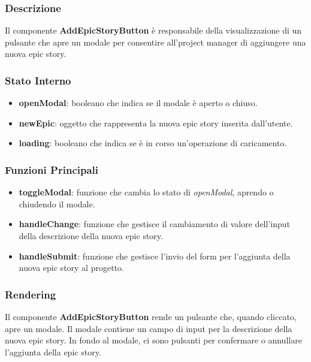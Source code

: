 \documentclass{article}
\begin{document}
\subsubsection*{Descrizione}
Il componente \textbf{AddEpicStoryButton} è responsabile della visualizzazione di un pulsante che apre un modale per consentire all'project manager di aggiungere una nuova epic story.

\subsubsection*{Stato Interno}
\begin{itemize}
    \item \textbf{openModal}: booleano che indica se il modale è aperto o chiuso.
    \item \textbf{newEpic}: oggetto che rappresenta la nuova epic story inserita dall'utente.
    \item \textbf{loading}: booleano che indica se è in corso un'operazione di caricamento.
\end{itemize}

\subsubsection*{Funzioni Principali}
\begin{itemize}
    \item \textbf{toggleModal}: funzione che cambia lo stato di \textit{openModal}, aprendo o chiudendo il modale.
    \item \textbf{handleChange}: funzione che gestisce il cambiamento di valore dell'input della descrizione della nuova epic story.
    \item \textbf{handleSubmit}: funzione che gestisce l'invio del form per l'aggiunta della nuova epic story al progetto.
\end{itemize}

\subsubsection*{Rendering}
Il componente \textbf{AddEpicStoryButton} rende un pulsante che, quando cliccato, apre un modale. Il modale contiene un campo di input per la descrizione della nuova epic story. In fondo al modale, ci sono pulsanti per confermare o annullare l'aggiunta della epic story.
\end{document}
